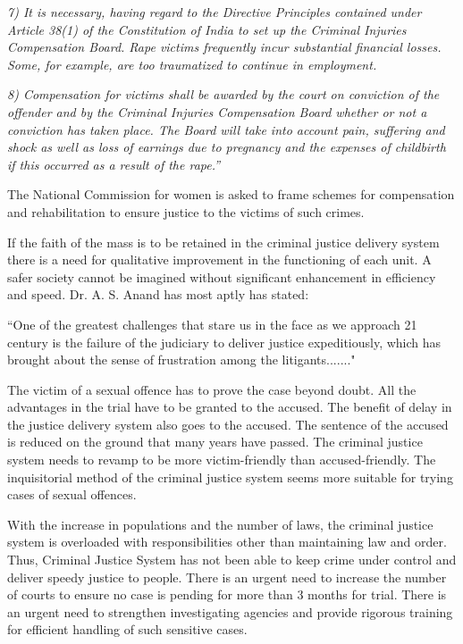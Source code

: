 \begin{multicols}{2}
\newpage
\noi
\textit{7) It is necessary, having regard to the Directive Principles contained under
Article 38(1) of the Constitution of India to set up the Criminal Injuries Compensation
Board. Rape victims frequently incur substantial financial losses. Some, for example,
are too traumatized to continue in employment.}

\noi
\textit{8) Compensation for victims shall be awarded by the court on conviction of the
offender and by the Criminal Injuries Compensation Board whether or not a conviction
has taken place. The Board will take into account pain, suffering and shock as well as
loss of earnings due to pregnancy and the expenses of childbirth if this occurred as a
result of the rape.”}

\noi
The National Commission for women is asked to frame schemes for compensation and
rehabilitation to ensure justice to the victims of such crimes.


\noi
If the faith of the mass is to be retained in the criminal justice delivery system there is
a need for qualitative improvement in the functioning of each unit. A safer society
cannot be imagined without significant enhancement in efficiency and speed. Dr. A. S.
Anand has most aptly has stated:

\noi
“One of the greatest challenges that stare us in the face as we approach 21 century is
the failure of the judiciary to deliver justice expeditiously, which has brought about the
sense of frustration among the litigants......."

\noi
The victim of a sexual offence has to prove the case beyond doubt. All the advantages
in the trial have to be granted to the accused. The benefit of delay in the justice delivery
system also goes to the accused. The sentence of the accused is reduced on the ground
that many years have passed. The criminal justice system needs to revamp to be more
victim-friendly than accused-friendly. The inquisitorial method of the criminal justice
system seems more suitable for trying cases of sexual offences.

\noi
With the increase in populations and the number of laws, the criminal justice system is
overloaded with responsibilities other than maintaining law and order. Thus, Criminal
Justice System has not been able to keep crime under control and deliver speedy justice
to people. There is an urgent need to increase the number of courts to ensure no case is
pending for more than 3 months for trial. There is an urgent need to strengthen
investigating agencies and provide rigorous training for efficient handling of such
sensitive cases.


\end{multicols}
